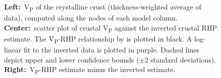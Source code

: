 \begin{subappendices}
\begin{figure}
	\begin{adjustbox}{center}
	\end{adjustbox}
	\caption[Relationship of RHP with V\textsubscript{P}, difference with fitted RHP.]{
		\textbf{Left:}~V\textsubscript{P} of the crystalline crust (thickness-weighted average of \cite{Pasyanos2014} data), computed along the nodes of each model column.
		\textbf{Center:}~scatter plot of crustal V\textsubscript{P} against the inverted crustal RHP estimate. The V\textsubscript{P}-RHP relationship by \cite{Hasterok2017_ign} is plotted in black. A log-linear fit to the inverted data is plotted in purple. Dashed lines depict upper and lower confidence bounds ($\pm$2 standard deviations).
		\textbf{Right:}~V\textsubscript{P}-RHP estimate minus the inverted estimate.}
	\label{fig:VpRHP}
\end{figure}

\end{subappendices}
